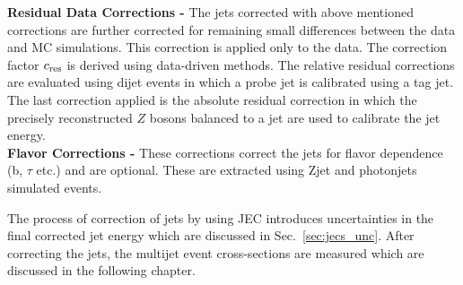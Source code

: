 {\bf Residual Data Corrections -} The jets corrected with above mentioned corrections are further corrected for remaining small differences between the data and MC simulations. This correction is applied only to the data. The correction factor $c_{\rm res}$ is derived using data-driven methods. The relative residual corrections are evaluated using dijet events in which a probe jet is calibrated using a tag jet. The last correction applied is the absolute residual correction in which the precisely reconstructed $Z$ bosons balanced to a jet are used to calibrate the jet energy. \\ \newline
{\bf Flavor Corrections -} These corrections correct the jets for flavor dependence (b, $\tau$ etc.) and are optional. These are extracted using Z\plusn jet and photon\plusn jets simulated events. %

The process of correction of jets by using JEC introduces uncertainties in the final corrected jet energy which are discussed in Sec.~\ref{sec:jecs_unc}. After correcting the jets, the multijet event cross-sections are measured which are discussed in the following chapter.
